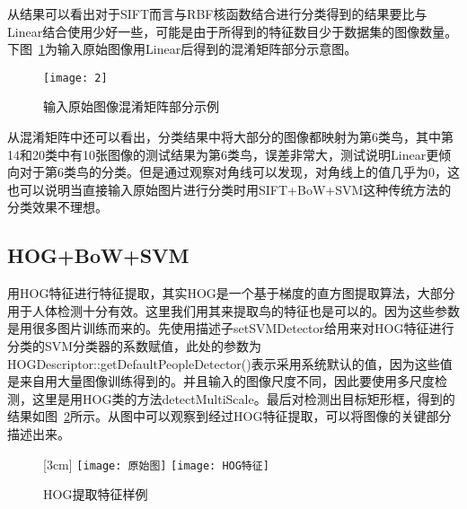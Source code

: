 从结果可以看出对于SIFT而言与RBF核函数结合进行分类得到的结果要比与Linear结合使用少好一些，可能是由于所得到的特征数目少于数据集的图像数量。下图~\ref{fig:siftlinear}为输入原始图像用Linear后得到的混淆矩阵部分示意图。

\begin{figure}[H] %
  \centering
  \texttt{[image: 2]}
  \caption{输入原始图像混淆矩阵部分示例}
  \label{fig:siftlinear}
\end{figure}

从混淆矩阵中还可以看出，分类结果中将大部分的图像都映射为第6类鸟，其中第14和20类中有10张图像的测试结果为第6类鸟，误差非常大，测试说明Linear更倾向对于第6类鸟的分类。但是通过观察对角线可以发现，对角线上的值几乎为0，这也可以说明当直接输入原始图片进行分类时用SIFT+BoW+SVM这种传统方法的分类效果不理想。

\subsection{HOG+BoW+SVM}
\label{subsec:hogbowsvm}
    用HOG特征进行特征提取，其实HOG是一个基于梯度的直方图提取算法，大部分用于人体检测十分有效。这里我们用其来提取鸟的特征也是可以的。因为这些参数是用很多图片训练而来的。先使用描述子setSVMDetector给用来对HOG特征进行分类的SVM分类器的系数赋值，此处的参数为HOGDescriptor::getDefaultPeopleDetector()表示采用系统默认的值，因为这些值是来自用大量图像训练得到的。并且输入的图像尺度不同，因此要使用多尺度检测，这里是用HOG类的方法detectMultiScale。最后对检测出目标矩形框，得到的结果如图~\ref{fig:hogtezhengyangli}所示。从图中可以观察到经过HOG特征提取，可以将图像的关键部分描述出来。
\begin{figure}[H]
\centering%
  [3cm] %
    {\texttt{[image: 原始图]}}%
  \qquad \qquad \qquad \qquad
      {\texttt{[image: HOG特征]}}
  \caption{HOG提取特征样例}
  \label{fig:hogtezhengyangli}
\end{figure}

